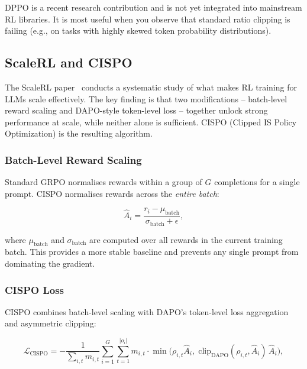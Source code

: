 \begin{warningbox}
DPPO is a recent research contribution and is not yet integrated into mainstream RL libraries. It is most useful when you observe that standard ratio clipping is failing (e.g., on tasks with highly skewed token probability distributions).
\end{warningbox}

\subsection{ScaleRL and CISPO}
\label{sec:scalerl-cispo}

\begin{intuitionbox}
The ScaleRL paper~\cite{luo2025scalerl} conducts a systematic study of what makes RL training for LLMs scale effectively. The key finding is that two modifications -- batch-level reward scaling and DAPO-style token-level loss -- together unlock strong performance at scale, while neither alone is sufficient. CISPO (Clipped IS Policy Optimization) is the resulting algorithm.
\end{intuitionbox}

\subsubsection*{Batch-Level Reward Scaling}
\label{batch-level-reward-scaling}

Standard GRPO normalises rewards within a group of $G$ completions for a single prompt. CISPO normalises rewards across the \emph{entire batch}:

\[
\hat{A}_i = \frac{r_i - \mu_{\text{batch}}}{\sigma_{\text{batch}} + \epsilon},
\]

where $\mu_{\text{batch}}$ and $\sigma_{\text{batch}}$ are computed over all rewards in the current training batch. This provides a more stable baseline and prevents any single prompt from dominating the gradient.

\subsubsection*{CISPO Loss}
\label{cispo-loss}

CISPO combines batch-level scaling with DAPO’s token-level loss aggregation and asymmetric clipping:

\[
\mathcal{L}_{\text{CISPO}} =
    -\frac{1}{\sum_{i,t} m_{i,t}}
    \sum_{i=1}^G \sum_{t=1}^{|o_i|} m_{i,t} \cdot
    \min\!\bigl(\rho_{i,t}\hat{A}_i,\;
               \mathrm{clip}_{\text{DAPO}}(\rho_{i,t},\hat{A}_i)\,\hat{A}_i\bigr),
\]

